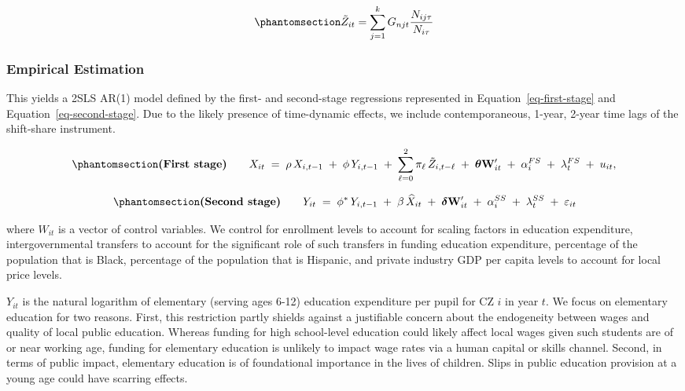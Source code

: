 \documentclass[
  10pt,
]{article}
\begin{document}
\begin{equation}\protect\phantomsection\label{eq-bartik}{
    \tilde{Z}_{it} = \sum_{j=1}^{k}G_{njt}  \frac{N_{ij\tau}}{N_{i\tau}} 
}\end{equation}

\subsubsection{Empirical Estimation}\label{empirical-estimation}

This yields a 2SLS AR(1) model defined by the first- and second-stage
regressions represented in Equation~\ref{eq-first-stage} and
Equation~\ref{eq-second-stage}. Due to the likely presence of
time-dynamic effects, we include contemporaneous, 1-year, 2-year time
lags of the shift-share instrument.

\begin{equation}\protect\phantomsection\label{eq-first-stage}{
\textbf{(First stage)}\qquad
X_{it} \;=\; \rho\,X_{i,t-1} \;+\; \phi \,Y_{i,t-1} \;+\; \sum_{\ell=0}^{2}\pi_{\ell}\,\tilde Z_{i,t-\ell}
\;+\; \boldsymbol{\theta}\mathbf{W}_{it}' \;+\; \alpha_i^{FS} \;+\; \lambda_t^{FS} \;+\; u_{it},
}\end{equation}

\begin{equation}\protect\phantomsection\label{eq-second-stage}{
\textbf{(Second stage)}\qquad
Y_{it} \;=\; \phi^\ast \,Y_{i,t-1} \;+\; \beta\,\widehat{X}_{it}
\;+\; \boldsymbol{\delta}\mathbf{W}_{it}'\;+\;  \alpha_i^{SS} \;+\; \lambda_t^{SS} \;+\; \varepsilon_{it}
}\end{equation}

where \(W_{it}\) is a vector of control variables. We control for
enrollment levels to account for scaling factors in education
expenditure, intergovernmental transfers to account for the significant
role of such transfers in funding education expenditure, percentage of
the population that is Black, percentage of the population that is
Hispanic, and private industry GDP per capita levels to account for
local price levels.

\(Y_{it}\) is the natural logarithm of elementary (serving ages 6-12)
education expenditure per pupil for CZ \(i\) in year \(t\). We focus on
elementary education for two reasons. First, this restriction partly
shields against a justifiable concern about the endogeneity between
wages and quality of local public education. Whereas funding for high
school-level education could likely affect local wages given such
students are of or near working age, funding for elementary education is
unlikely to impact wage rates via a human capital or skills channel.
Second, in terms of public impact, elementary education is of
foundational importance in the lives of children. Slips in public
education provision at a young age could have scarring effects.
\end{document}
